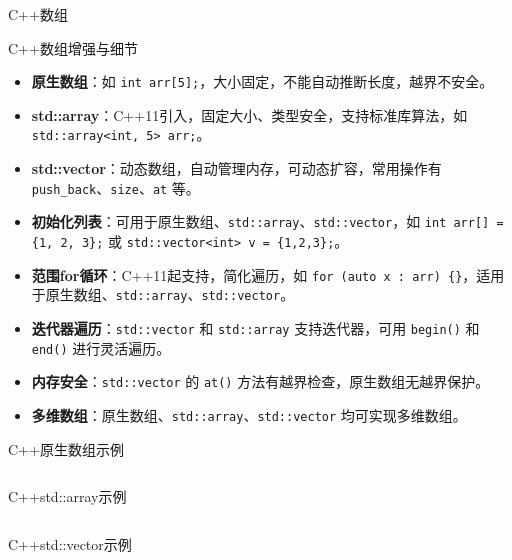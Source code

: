 \documentclass[UTF8,aspectratio=169]{beamer}
\begin{document}
\begin{frame}{C++数组}
    \begin{ytublock}{C++数组增强与细节}
        \begin{itemize}
            \item \textbf{原生数组}：如 \texttt{int arr[5];}，大小固定，不能自动推断长度，越界不安全。
            \item \textbf{std::array}：C++11引入，固定大小、类型安全，支持标准库算法，如 \texttt{std::array<int, 5> arr;}。
            \item \textbf{std::vector}：动态数组，自动管理内存，可动态扩容，常用操作有 \texttt{push\_back}、\texttt{size}、\texttt{at} 等。
            \item \textbf{初始化列表}：可用于原生数组、\texttt{std::array}、\texttt{std::vector}，如 \texttt{int arr[] = \{1, 2, 3\};} 或 \texttt{std::vector<int> v = \{1,2,3\};}。
            \item \textbf{范围for循环}：C++11起支持，简化遍历，如 \texttt{for (auto x : arr) \{\}}，适用于原生数组、\texttt{std::array}、\texttt{std::vector}。
            \item \textbf{迭代器遍历}：\texttt{std::vector} 和 \texttt{std::array} 支持迭代器，可用 \texttt{begin()} 和 \texttt{end()} 进行灵活遍历。
            \item \textbf{内存安全}：\texttt{std::vector} 的 \texttt{at()} 方法有越界检查，原生数组无越界保护。
            \item \textbf{多维数组}：原生数组、\texttt{std::array}、\texttt{std::vector} 均可实现多维数组。
        \end{itemize}
    \end{ytublock}
\end{frame}

\begin{frame}[fragile]{C++原生数组示例}
    \inputminted[firstline=1,lastline=20]{cpp}{code/cpp_array_example.cpp}
\end{frame}

\begin{frame}[fragile]{C++std::array示例}
    \inputminted[firstline=1,lastline=20]{cpp}{code/cpp_stdarray_example.cpp}
\end{frame}

\begin{frame}[fragile]{C++std::vector示例}
        \begin{columns}
        \begin{column}{0.48\textwidth}
            \inputminted[firstline=1,lastline=17]{cpp}{code/cpp_vector_example.cpp}
        \end{column}
        \begin{column}{0.48\textwidth}
            \inputminted[firstline=18,lastline=38]{cpp}{code/cpp_vector_example.cpp}
        \end{column}
    \end{columns}
\end{frame}
\end{document}
